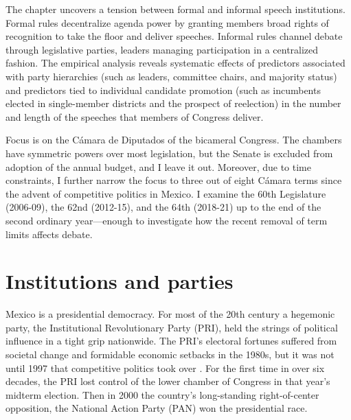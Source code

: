 \documentclass[letter,12pt]{article}
\begin{document}
The chapter uncovers a tension between formal and informal speech institutions. Formal rules decentralize agenda power by granting members broad rights of recognition to take the floor and deliver speeches. Informal rules channel debate through legislative parties, leaders managing participation in a centralized fashion. The empirical analysis reveals systematic effects of predictors associated with party hierarchies (such as leaders, committee chairs, and majority status) and predictors tied to individual candidate promotion (such as incumbents elected in single-member districts and the prospect of reelection) in the number and length of the speeches that members of Congress deliver. 

Focus is on the Cámara de Diputados of the bicameral Congress. The chambers have symmetric powers over most legislation, but the Senate is excluded from adoption of the annual budget, and I leave it out. Moreover, due to time constraints, I further narrow the focus to three out of eight Cámara terms since the advent of competitive politics in Mexico. I examine the 60th Legislature (2006-09), the 62nd (2012-15), and the 64th (2018-21) up to the end of the second ordinary year---enough to investigate how the recent removal of term limits affects debate.


\section{Institutions and parties} %


Mexico is a presidential democracy. For most of the 20th century a hegemonic party, the Institutional Revolutionary Party (PRI), held the strings of political influence in a tight grip nationwide. The PRI's electoral fortunes suffered from societal change and formidable economic setbacks in the 1980s, but it was not until 1997 that competitive politics took over \citep{scott.1959,cosio.villegas.1981,molinar.1991a,cornelius.1996}. For the first time in over six decades, the PRI lost control of the lower chamber of Congress in that year's midterm election. Then in 2000 the country's long-standing right-of-center opposition, the National Action Party (PAN) won the presidential race.  
\end{document}
